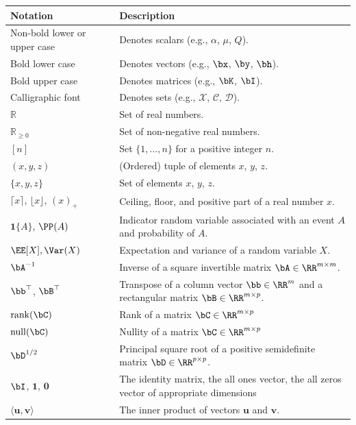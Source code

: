 \documentclass[11pt]{article}
\numberwithin{equation}{section}
\numberwithin{figure}{section}
\begin{document}
\begin{table}[ht]
\centering
\begin{tabularx}{\textwidth}{L{2.75cm}L{12.5cm}}
\toprule
\textbf{Notation} & \textbf{Description} \\
\midrule
Non-bold lower or upper case & Denotes scalars (e.g., $\alpha$, $\mu$, $Q$). \\
Bold lower case & Denotes vectors (e.g., $\bx$, $\by$, $\bh$). \\
Bold upper case & Denotes matrices (e.g., $\bK$, $\bI$). \\
Calligraphic font & Denotes sets (e.g., $\mathcal{X}$, $\mathcal{C}$, $\mathcal{D}$). \\
\midrule
$\mathbb{R}$ & Set of real numbers. \\
$\mathbb{R}_{\ge 0}$ & Set of non-negative real numbers. \\
$[n]$ & Set $\{1, \dots, n\}$ for a positive integer $n$. \\
$(x, y, z)$ & (Ordered) tuple of elements $x$, $y$, $z$. \\
$\{x, y, z\}$ & Set of elements $x$, $y$, $z$. \\
\midrule
$\lceil x \rceil$, $\lfloor x \rfloor$,  $(x)_{+}$ & Ceiling, floor, and positive part of a real number $x$. \\
$\bm{1}\{A\}$, $\PP(A)$ & Indicator random variable associated with an event $A$ and probability of $A$. \\
$\EE[X], \Var(X)$ & Expectation and variance of a random variable $X$. \\
\midrule
$\bA^{-1}$ & Inverse of a square invertible matrix $\bA \in \RR^{m \times m}$. \\
$\bb^\top$, $\bB^\top$ & Transpose of a column vector $\bb \in \RR^{m}$ and a rectangular matrix $\bB \in \RR^{m \times p}$. \\
$\mathrm{rank}(\bC)$ & Rank of a matrix $\bC \in \RR^{m \times p}$ \\
$\mathrm{null}(\bC)$ & Nullity of a matrix $\bC \in \RR^{m \times p}$ \\
$\bD^{1/2}$ & Principal square root of a positive semidefinite matrix $\bD \in \RR^{p \times p}$.  \\
$\bI$, $\bm{1}$, $\bm{0}$ & The identity matrix, the all ones vector, the all zeros vector of appropriate dimensions \\
\midrule
$\langle \mathbf{u}, \mathbf{v} \rangle$ & The inner product of vectors $\mathbf{u}$ and $\mathbf{v}$. \\

\end{tabularx}
\end{table}
\end{document}
